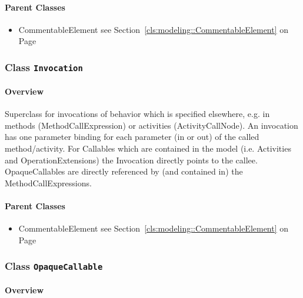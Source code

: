 	



\paragraph{Parent Classes}
\begin{itemize}
\item CommentableElement see Section~\ref{cls:modeling::CommentableElement} on Page~\pageref{cls:modeling::CommentableElement}\end{itemize}
\subsubsection{\Large{Class \bfseries \texttt{Invocation}\normalfont}}
\label{cls:modeling::calls::Invocation} 
\paragraph{Overview}

	
			
Superclass for invocations of behavior which is specified elsewhere, e.g. in methods (MethodCallExpression) or activities (ActivityCallNode). An invocation has one parameter binding for each parameter (in or out) of the called method/activity. For Callables which are contained in the model (i.e. Activities and OperationExtensions) the Invocation directly points to the callee. OpaqueCallables are directly referenced by (and contained in) the MethodCallExpressions.	
		
	



\paragraph{Parent Classes}
\begin{itemize}
\item CommentableElement see Section~\ref{cls:modeling::CommentableElement} on Page~\pageref{cls:modeling::CommentableElement}\end{itemize}
\subsubsection{\Large{Class \bfseries \texttt{OpaqueCallable}\normalfont}}
\label{cls:modeling::calls::OpaqueCallable} 
\paragraph{Overview}

